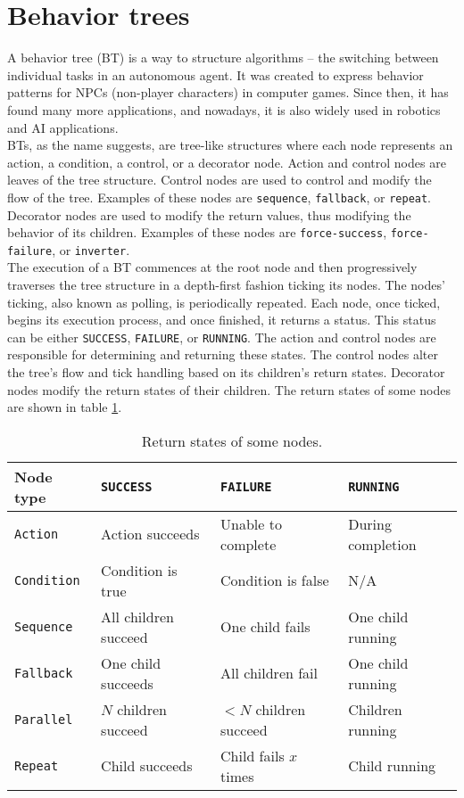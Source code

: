 \section{Behavior trees}
    A behavior tree (BT) is a way to structure algorithms -- the switching between individual tasks in an autonomous agent. It was created to express behavior patterns for NPCs (non-player characters) in computer games. Since then, it has found many more applications, and nowadays, it is also widely used in robotics and AI applications.\\
    BTs, as the name suggests, are tree-like structures where each node represents an action, a condition, a control, or a decorator node. Action and control nodes are leaves of the tree structure. Control nodes are used to control and modify the flow of the tree. Examples of these nodes are \texttt{sequence}, \texttt{fallback}, or \texttt{repeat}. Decorator nodes are used to modify the return values, thus modifying the behavior of its children. Examples of these nodes are \texttt{force-success}, \texttt{force-failure}, or \texttt{inverter}.\\
    The execution of a BT commences at the root node and then progressively traverses the tree structure in a depth-first fashion ticking its nodes. The nodes' ticking, also known as polling, is periodically repeated. Each node, once ticked, begins its execution process, and once finished, it returns a status. This status can be either \texttt{SUCCESS}, \texttt{FAILURE}, or \texttt{RUNNING}. The action and control nodes are responsible for determining and returning these states. The control nodes alter the tree's flow and tick handling based on its children's return states. Decorator nodes modify the return states of their children. The return states of some nodes are shown in table \ref{tab:returns}.
    \begin{table}[H]
        \centering
        \begin{tabular}{|l|l|l|l|}
            \hline
            Node type & \texttt{SUCCESS} & \texttt{FAILURE} & \texttt{RUNNING} \\
            \hline\hline
            \texttt{Action} & Action succeeds & Unable to complete & During completion \\
            \hline
            \texttt{Condition} & Condition is true & Condition is false & N/A \\
            \hline
            \texttt{Sequence} & All children succeed & One child fails & One child running \\
            \hline
            \texttt{Fallback} & One child succeeds & All children fail & One child running \\
            \hline
            \texttt{Parallel} & $N$ children succeed & $<N$ children succeed & Children running \\
            \hline
            \texttt{Repeat} & Child succeeds & Child fails $x$ times & Child running \\
            \hline
        \end{tabular}
        \caption{Return states of some nodes.}
        \label{tab:returns}
    \end{table}

